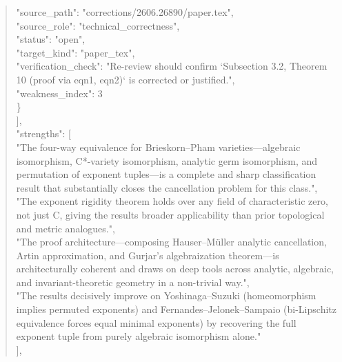 \documentclass[11pt]{article}
\begin{document}
\begin{quote}
      "source\_path": "corrections/2606.26890/paper.tex",\\
      "source\_role": "technical\_correctness",\\
      "status": "open",\\
      "target\_kind": "paper\_tex",\\
      "verification\_check": "Re-review should confirm `Subsection 3.2, Theorem 10 (proof via eqn1, eqn2)` is corrected or justified.",\\
      "weakness\_index": 3\\
    \}\\
  ],\\
  "strengths": [\\
    "The four-way equivalence for Brieskorn--Pham varieties---algebraic isomorphism, C*-variety isomorphism, analytic germ isomorphism, and permutation of exponent tuples---is a complete and sharp classification result that substantially closes the cancellation problem for this class.",\\
    "The exponent rigidity theorem holds over any field of characteristic zero, not just C, giving the results broader applicability than prior topological and metric analogues.",\\
    "The proof architecture---composing Hauser--Müller analytic cancellation, Artin approximation, and Gurjar's algebraization theorem---is architecturally coherent and draws on deep tools across analytic, algebraic, and invariant-theoretic geometry in a non-trivial way.",\\
    "The results decisively improve on Yoshinaga--Suzuki (homeomorphism implies permuted exponents) and Fernandes--Jelonek--Sampaio (bi-Lipschitz equivalence forces equal minimal exponents) by recovering the full exponent tuple from purely algebraic isomorphism alone."\\
  ],\\

\end{quote}
\end{document}
